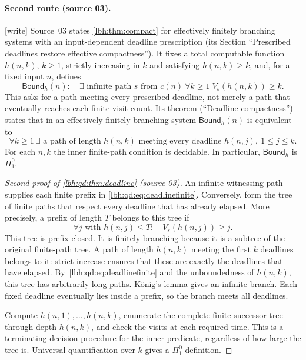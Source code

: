 \documentclass[11pt,letterpaper]{article}
\theoremstyle{definition}
\theoremstyle{remark}
\newcommand{\BH}{\mathsf{Bound}}
\newcommand{\1}{\mathbf 1}
\newcommand{\wtag}{\textup{[write]}}%
\begin{document}
\paragraph{Second route (source 03).}
\wtag{} Source~03 states \cref{lbh:thm:compact} for effectively finitely branching systems with
an input-dependent deadline prescription (its Section ``Prescribed deadlines restore effective
compactness''). It fixes a total computable function $h(n,k)$, $k\geq1$, strictly increasing in
$k$ and satisfying $h(n,k)\geq k$, and, for a fixed input $n$, defines
\[
 \BH_h(n):\quad\exists\text{ infinite path }s\text{ from }c(n)
       \ \forall k\geq1\;V_s(h(n,k))\geq k.
\]
This asks for a path meeting every prescribed deadline, not merely a path that eventually
reaches each finite visit count. Its theorem (``Deadline compactness'') states that in an
effectively finitely branching system $\BH_h(n)$ is equivalent to
\begin{equation}\label{lbh:qd:eq:deadlinefinite}
 \forall k\geq1\ \exists\text{ a path of length }h(n,k)
 \text{ meeting every deadline }h(n,j),\ 1\leq j\leq k.
\end{equation}
For each $n,k$ the inner finite-path condition is decidable. In particular,
$\BH_h$ is $\Pi^0_1$.
\begin{proof}[Second proof of \cref{lbh:qd:thm:deadline} (source 03)]
An infinite witnessing path supplies each finite prefix in
\eqref{lbh:qd:eq:deadlinefinite}. Conversely, form the tree of finite paths that
respect every deadline that has already elapsed. More precisely, a prefix
of length $T$ belongs to this tree if
\[
 \forall j\text{ with }h(n,j)\leq T:\quad V_s(h(n,j))\geq j.
\]
This tree is prefix closed. It is finitely branching because it is a subtree
of the original finite-path tree. A path of length $h(n,k)$ meeting the first
$k$ deadlines belongs to it: strict increase ensures that these are exactly
the deadlines that have elapsed. By~\eqref{lbh:qd:eq:deadlinefinite} and the
unboundedness of $h(n,k)$, this tree has arbitrarily long paths. K\"onig's
lemma gives an infinite branch. Each fixed deadline eventually lies inside
a prefix, so the branch meets all deadlines.

Compute $h(n,1),\ldots,h(n,k)$, enumerate the complete finite successor tree
through depth $h(n,k)$, and check the visits at each required time. This is
a terminating decision procedure for the inner predicate, regardless of
how large the tree is. Universal quantification over $k$ gives a
$\Pi^0_1$ definition.
\end{proof}
\end{document}
